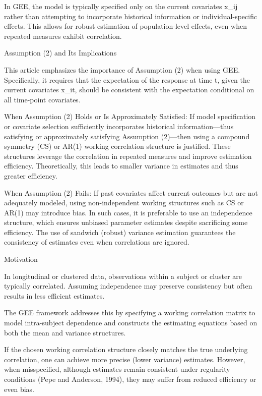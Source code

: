 \documentclass[
]{article}
\begin{document}
In GEE, the model is typically specified only on the current covariates
x\_ij rather than attempting to incorporate historical information or
individual-specific effects. This allows for robust estimation of
population-level effects, even when repeated measures exhibit
correlation.

Assumption (2) and Its Implications

This article emphasizes the importance of Assumption (2) when using GEE.
Specifically, it requires that the expectation of the response at time
t, given the current covariates x\_it, should be consistent with the
expectation conditional on all time-point covariates.

When Assumption (2) Holds or Is Approximately Satisfied: If model
specification or covariate selection sufficiently incorporates
historical information---thus satisfying or approximately satisfying
Assumption (2)---then using a compound symmetry (CS) or AR(1) working
correlation structure is justified. These structures leverage the
correlation in repeated measures and improve estimation efficiency.
Theoretically, this leads to smaller variance in estimates and thus
greater efficiency.

When Assumption (2) Fails: If past covariates affect current outcomes
but are not adequately modeled, using non-independent working structures
such as CS or AR(1) may introduce bias. In such cases, it is preferable
to use an independence structure, which ensures unbiased parameter
estimates despite sacrificing some efficiency. The use of sandwich
(robust) variance estimation guarantees the consistency of estimates
even when correlations are ignored.

Motivation

In longitudinal or clustered data, observations within a subject or
cluster are typically correlated. Assuming independence may preserve
consistency but often results in less efficient estimates.

The GEE framework addresses this by specifying a working correlation
matrix to model intra-subject dependence and constructs the estimating
equations based on both the mean and variance structures.

If the chosen working correlation structure closely matches the true
underlying correlation, one can achieve more precise (lower variance)
estimates. However, when misspecified, although estimates remain
consistent under regularity conditions (Pepe and Anderson, 1994), they
may suffer from reduced efficiency or even bias.
\end{document}
